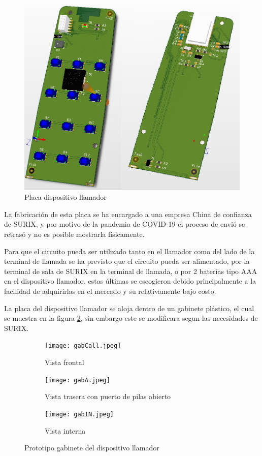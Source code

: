 \begin{figure}[htpb]
	\centering
	\includegraphics[scale=0.4]{./Figures/placas.jpeg}
	\caption{Placa dispositivo llamador}
	\label{fig:pcb}
\end{figure}

La fabricación de esta placa se ha encargado a una empresa China de confianza de SURIX, y por  motivo de la pandemia de COVID-19 el proceso de envió se retrasó y no es posible mostrarla físicamente.

Para que el circuito pueda ser utilizado tanto en el llamador como del lado de la terminal de llamada se ha previsto que el circuito pueda ser alimentado, por la terminal de sala de SURIX en la terminal de llamada, o por 2 baterías tipo AAA en el dispositivo llamador, estas últimas se escogieron debido principalmente a la facilidad de adquirirlas en el mercado y su relativamente bajo costo.

La placa del dispositivo llamador se aloja dentro de un gabinete plástico, el cual se muestra en la figura \ref{fig:gabinete}, sin embargo este se modificara segun las necesidades de SURIX.

\begin{figure}[htpb]
	\centering
   	\begin{subfigure}[b]{0.3\textwidth}
   		\centering
      	\texttt{[image: gabCall.jpeg]}
      	\caption{Vista frontal}
   	\end{subfigure}%
   	\begin{subfigure}[b]{0.3\textwidth}
   		\centering
      	\texttt{[image: gabA.jpeg]}
      	\caption{Vista trasera con puerto de pilas abierto}
   	\end{subfigure}%
   	\begin{subfigure}[b]{0.3\textwidth}
   		\centering
      	\texttt{[image: gabIN.jpeg]}
      	\caption{Vista interna}
   	\end{subfigure}%
	\caption{Prototipo gabinete del dispositivo llamador}
	\label{fig:gabinete}
\end{figure}

